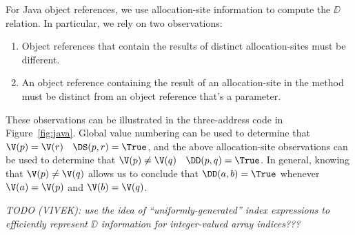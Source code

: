 {For Java object references, we use allocation-site information to compute
the $\DD$ relation.  In particular, we rely on two observations:
\begin{enumerate}
\item Object references that contain the results of distinct allocation-sites
must be different.
\item An object reference containing the result of an allocation-site
in the method must be distinct from an object reference that's a parameter.
\end{enumerate}
These observations can be illustrated in the three-address code in
Figure~\ref{fig:java}.  Global value numbering can be used to
determine that $\V(p) = \V(r)$ \ie\ $\DS(p,r) = \True$,
and the above allocation-site observations can be used to determine
that $\V(p) \not= \V(q)$ \ie\ $\DD(p,q) = \True$.
In general, knowing that $\V(p) \not= \V(q)$ allows
us to conclude that $\DD(a,b) = \True$ whenever 
$\V(a) = \V(p)$ and $\V(b) = \V(q)$.



{\it
TODO (VIVEK): use the idea of ``uniformly-generated'' index expressions to efficiently
represent $\DD$ information for integer-valued array indices???
}

}



